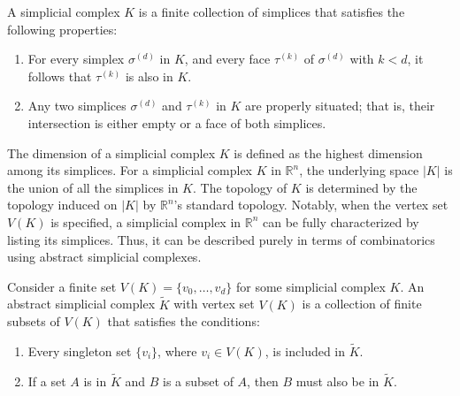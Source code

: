 \begin{definition}
	{\cite[Definition 2.2]{boissonnat2018geometric}} \label{simplicialcomplex}
	A simplicial complex $K$ is a finite collection of simplices that satisfies the
	following properties:
	\begin{enumerate}
		\item For every simplex $\sigma^{(d)}$ in $K$, and every face $\tau^{(k)}$
		      of $\sigma^{(d)}$ with $k < d$, it follows that $\tau^{(k)}$ is also in $K$.
		      		      		      		      		      
		\item Any two simplices $\sigma^{(d)}$ and $\tau^{(k)}$ in $K$ are properly situated;
		      that is, their intersection is either empty or a face of both simplices.
	\end{enumerate}
\end{definition}

The dimension of a simplicial complex $K$ is defined as the highest dimension among its simplices. For a simplicial complex $K$ in $\mathbb{R}^{n}$, the underlying space $\vert K \vert$ is the union of all the simplices in $K$. The topology of $K$ is determined by the topology induced on $\vert K \vert$ by $\mathbb{R}^{n}$'s
standard topology. Notably, when the vertex set $V(K)$ is specified, a simplicial complex
in $\mathbb{R}^{n}$ can be fully characterized by listing its simplices. Thus, it
can be described purely in terms of combinatorics using abstract simplicial complexes.

\begin{definition}
	{\cite[Definition 2.3]{boissonnat2018geometric}} \label{abstractsimplicialcomplex}
	Consider a finite set $V(K) = \{v_{0}, \ldots, v_{d}\}$ for some simplicial complex $K$. An abstract simplicial
	complex $\tilde{K}$ with vertex set $V(K)$ is a
	collection of finite subsets of $V(K)$ that satisfies the conditions:
	\begin{enumerate}
		\item Every singleton set $\{v_{i}\}$, where $v_{i} \in V(K)$, is included in $\tilde
		      {K}$.
		      		      		      		      		      
		\item If a set $A$ is in $\tilde{K}$ and $B$ is a subset
		      of $A$, then $B$ must also be in $\tilde{K}$.
	\end{enumerate}
\end{definition}

